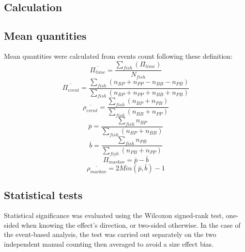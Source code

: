 \begin{appendices}
  \chapter{Calculation}
   \label{mean_quantities}
    \section{Mean quantities}
    Mean quantities were calculated from events count following these definition:
    \begin{equation}
      \overline{\Pi_{time}} = \frac{\sum_{fish}^{}(\Pi_{time})}{N_{fish}}
      \label{mean_pi_time}
    \end{equation}
    \begin{equation}
      \overline{\Pi_{event}} = \frac{\sum_{fish}^{}(n_{BP} + n_{PP} - n_{BB} - n_{PB})}{\sum_{fish}^{}(n_{BP} + n_{PP} + n_{BB} + n_{PB})}
      \label{mean_pi_event}
    \end{equation}
    \begin{equation}
      \overline{\rho_{event}} =\frac{\sum_{fish}^{}(n_{BP} + n_{PB})}{\sum_{fish}^{}(n_{BB} + n_{PP})}
      \label{mean_r_event}
    \end{equation}
    \begin{equation}
      \overline{p} = \frac{\sum_{fish}^{}n_{BP}}{\sum_{fish}^{}(n_{BP} + n_{BB})}
    \end{equation}
    \begin{equation}
      \overline{b} = \frac{\sum_{fish}^{}n_{PB}}{\sum_{fish}^{}(n_{PB} + n_{PP})}
    \end{equation}
    \begin{equation}
      \overline{\Pi_{markov}} = \bar{p} - \bar{b}
      \label{mean_pi_markov}
    \end{equation}
    \begin{equation}
      \overline{\rho_{markov}} = 2Min(\bar{p}, \bar{b}) - 1
      \label{mean_r_markov}
    \end{equation}

    \section{Statistical tests}
    Statistical significance was evaluated using the Wilcoxon signed-rank test, one-sided when knowing the effect's direction, or two-sided otherwise. In the case of the event-based analysis, the test was carried out separately on the two independent manual counting then averaged to avoid a size effect bias.


\end{appendices}
